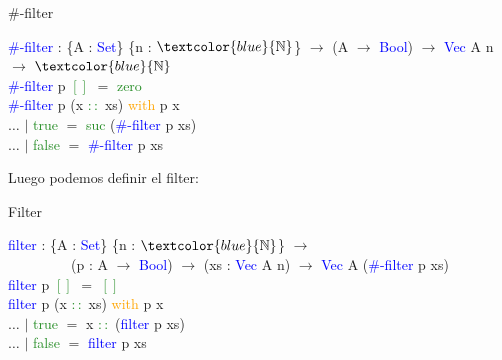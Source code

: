 \documentclass[xcolor=dvipsnames]{beamer} %
\newcommand{\cf}[1]{\textcolor{blue}{#1}}
\newcommand{\ct}[1]{\textcolor{blue}{#1}}
\newcommand{\cc}[1]{\textcolor{ForestGreen}{#1}}
\newcommand{\ck}[1]{\textcolor{orange}{#1}}
\newcommand{\N}{\ct{\mathbb{N}}}
\newcommand{\ra}{\rightarrow}
\begin{document}
\begin{frame}

  \begin{block}{$\#$-filter}\small

  \cf{$\#$-filter} : \{A : \ct{Set}\} \{n : $\N$\} $\ra$ (A $\ra$ \ct{Bool}) $\ra$ \ct{Vec} A n $\ra$ $\N$\\
  \cf{$\#$-filter} p \cc{$[]$} $=$ \cc{zero}\\
  \cf{$\#$-filter} p (x \cc{$::$} xs) \ck{with} p x\\
  $\ldots$ $|$ \cc{true}  $=$ \cc{suc} (\cf{$\#$-filter} p xs)\\
  $\ldots$ $|$ \cc{false} $=$ \cf{$\#$-filter} p xs
  \end{block}
  
  \pause
  
  \begin{block}{}
    Luego podemos definir el filter:
  \end{block}

  \pause

  \begin{block}{Filter}\small

  \cf{filter} : \{A : \ct{Set}\} \{n : $\N$\} $\ra$\\
  \ \ \ \ \ \ \ \ \ (p : A $\ra$ \ct{Bool}) $\ra$ (xs : \ct{Vec} A n) $\ra$ \ct{Vec} A (\cf{$\#$-filter} p xs)\\
  \cf{filter} p \cc{$[]$} $=$ \cc{$[]$}\\
  \cf{filter} p (x \cc{$::$} xs) \ck{with} p x\\
  $\ldots$ $|$ \cc{true}  $=$ x \cc{$::$} (\cf{filter} p xs)\\
  $\ldots$ $|$ \cc{false} $=$ \cf{filter} p xs

  \end{block}

\end{frame}
\end{document}
